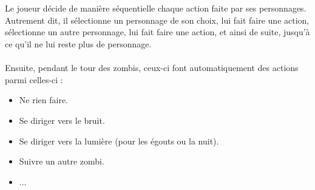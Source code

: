 \\\\
Le joueur décide de manière séquentielle chaque action faite par ses personnages. Autrement dit, il sélectionne un personnage de son choix, lui fait faire une action, sélectionne un autre personnage, lui fait faire une action, et ainsi de suite, jusqu'à ce qu'il ne lui reste plus de personnage.
\\\\
Ensuite, pendant le tour des zombis, ceux-ci font automatiquement des actions parmi celles-ci :
\begin{itemize}
  \item Ne rien faire.
  \item Se diriger vers le bruit.
  \item Se diriger vers la lumière (pour les égouts ou la nuit).
  \item Suivre un autre zombi.
  \item ...
\end{itemize}